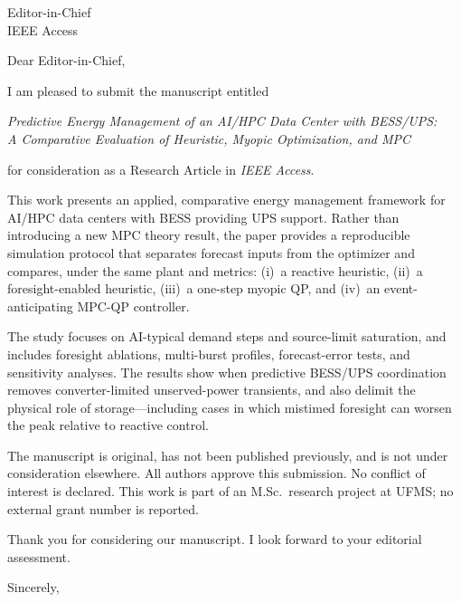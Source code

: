 \documentclass[11pt]{letter}
\date{\today}
\begin{document}
\begin{letter}{Editor-in-Chief\\
IEEE Access}

\opening{Dear Editor-in-Chief,}

I am pleased to submit the manuscript entitled

\begin{center}
\textit{Predictive Energy Management of an AI/HPC Data Center with BESS/UPS:\\
A Comparative Evaluation of Heuristic, Myopic Optimization, and MPC}
\end{center}

for consideration as a Research Article in \textit{IEEE Access}.

This work presents an applied, comparative energy management framework for AI/HPC data centers with BESS providing UPS support. Rather than introducing a new MPC theory result, the paper provides a reproducible simulation protocol that separates forecast inputs from the optimizer and compares, under the same plant and metrics: (i)~a reactive heuristic, (ii)~a foresight-enabled heuristic, (iii)~a one-step myopic QP, and (iv)~an event-anticipating MPC-QP controller.

The study focuses on AI-typical demand steps and source-limit saturation, and includes foresight ablations, multi-burst profiles, forecast-error tests, and sensitivity analyses. The results show when predictive BESS/UPS coordination removes converter-limited unserved-power transients, and also delimit the physical role of storage---including cases in which mistimed foresight can worsen the peak relative to reactive control.

The manuscript is original, has not been published previously, and is not under consideration elsewhere. All authors approve this submission. No conflict of interest is declared. This work is part of an M.Sc.\ research project at UFMS; no external grant number is reported.

Thank you for considering our manuscript. I look forward to your editorial assessment.

\closing{Sincerely,}

\end{letter}
\end{document}
